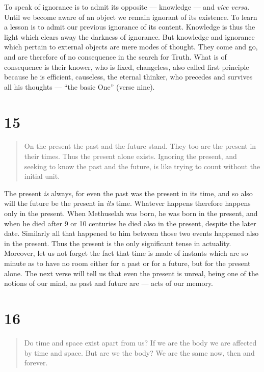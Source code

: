 \documentclass[12pt]{report}
\begin{document}

To speak of ignorance is to admit its opposite --- knowledge --- and
\emph{vice versa}. Until we become aware of an object we remain
ignorant of its existence. To learn a lesson is to admit our previous
ignorance of its content. Knowledge is thus the light which clears
away the darkness of ignorance. But knowledge and ignorance which
pertain to external objects are mere modes of thought. They come and
go, and are therefore of no consequence in the search for Truth. What
is of consequence is their knower, who is fixed, changeless, also
called first principle because he is efficient, causeless, the eternal
thinker, who precedes and survives all his thoughts --- ``the basic
One'' (verse nine).

\section{15}

\begin{quote}
On the present the past and the future stand. They too are the present
in their times. Thus the present alone exists. Ignoring the present,
and seeking to know the past and the future, is like trying to count
without the initial unit.
\end{quote}

The present \emph{is} always, for even the past was the present in its
time, and so also will the future be the present in \emph{its}
time. Whatever happens therefore happens only in the present. When
Methuselah was born, he was born in the present, and when he died
after 9 or 10 centuries he died also in the present, despite the later
date. Similarly all that happened to him between those two events
happened also in the present. Thus the present is the only significant
tense in actuality. Moreover, let us not forget the fact that time is
made of instants which are so minute as to have no room either for a
past or for a future, but for the present alone. The next verse will
tell us that even the present is unreal, being one of the notions of
our mind, as past and future are --- acts of our memory.


\section{16}

\begin{quote}
Do time and space exist apart from us? If we are the body we are
affected by time and space. But are we the body? We are the same now,
then and forever.
\end{quote}
\end{document}
